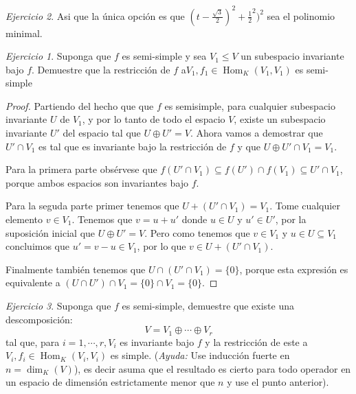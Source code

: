 \documentclass[11pt,a4paper]{article}
\theoremstyle{definition}
\theoremstyle{remark}
\newtheorem{exc}{Ejercicio}
\newcommand{\Hom}{\operatorname{Hom}}
\begin{document}
\begin{exc}
			Asi que la única opción es que $ (t-\frac{\sqrt{3}}{2})^2+\frac{1}{2}^2)^2 $ sea el polinomio minimal. 
	\begin{exc}
		Suponga que $ f $ es semi-simple y sea $ V_1 \leq V $ un subespacio invariante bajo $ f $. Demuestre que la restricción de $ f $ a$ V_1, f_1 \in \Hom_K (V_1,V_1) $ es semi-simple
	\end{exc}
		 
\end{exc}


\begin{proof}
		Partiendo del hecho que que $ f $ es semisimple, para cualquier subespacio invariante $ U $ de $ V_1 $, y por lo tanto de todo el espacio $ V $, existe un subespacio invariante $ U' $ del espacio tal que $ U \oplus U' = V $. Ahora vamos a demostrar que $ U' \cap V_1 $ es tal que es invariante bajo la restricción de $ f $ y que $ U \oplus U' \cap V_1 = V_1 $.
		
		Para la primera parte obsérvese que $ f(U' \cap V_1)\subseteq f(U')\cap f(V_1) \subseteq U' \cap V_1$, porque ambos espacios son invariantes bajo $ f $. 
		
		Para la seguda parte primer tenemos que $ U + (U' \cap V_1) = V_1 $. Tome cualquier elemento  $ v \in V_1 $. Tenemos que $ v = u+u'$ donde $ u \in U $ y $ u' \in U' $, por la suposición inicial que $ U \oplus U' = V $. Pero como tenemos que $ v \in V_1 $ y $ u \in U \subseteq V_1 $ concluimos que $ u' = v-u \in V_1 $, por lo que $ v \in U + (U' \cap V_1) $.
		
		Finalmente también tenemos que $ U \cap (U' \cap V_1) = \{0\}  $, porque esta expresión es equivalente a $ (U \cap U') \cap V_1 = \{0\} \cap V_1 = \{0\}$.
\end{proof}	

\begin{exc}
	Suponga que $ f $ es semi-simple, demuestre que existe una descomposición:
	\[ V = V_1 \oplus \cdots \oplus V_r \]
	tal que, para $ i = 1, \cdots, r, V_i $ es invariante bajo $ f $ y la restricción de este a $ V_i, f_i \in \Hom_K (V_i, V_i) $ es simple. (\textit{Ayuda: } Use inducción fuerte en $ n = \dim_K (V) $), es decir asuma que el resultado es cierto para todo operador en un espacio de dimensión estrictamente menor que $ n $ y use el punto anterior).
	

\end{exc}
\end{document}
